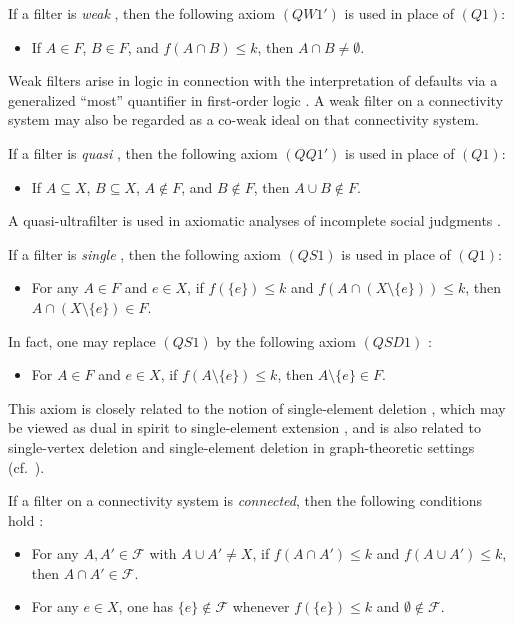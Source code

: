 \documentclass[10pt]{book}
\theoremstyle{definition}
\begin{document}
If a filter is \emph{weak} \cite{15,81,111,FujitaMaxQuasi2024}, then the following axiom \((QW1')\) is used in place of \((Q1)\):
\begin{itemize}
    \item[(QW1')] If \(A\in F\), \(B\in F\), and \(f(A\cap B)\leq k\), then \(A\cap B\neq\emptyset\).
\end{itemize}
Weak filters arise in logic in connection with the interpretation of defaults via a generalized ``most'' quantifier in first-order logic \cite{81,111,243,224}.  
A weak filter on a connectivity system may also be regarded as a co-weak ideal on that connectivity system.

If a filter is \emph{quasi} \cite{14,112,FujitaMaxQuasi2024}, then the following axiom \((QQ1')\) is used in place of \((Q1)\):
\begin{itemize}
    \item[(QQ1')] If \(A\subseteq X\), \(B\subseteq X\), \(A\notin F\), and \(B\notin F\), then \(A\cup B\notin F\).
\end{itemize}
A quasi-ultrafilter is used in axiomatic analyses of incomplete social judgments \cite{112}.

If a filter is \emph{single} \cite{4}, then the following axiom \((QS1)\) is used in place of \((Q1)\):
\begin{itemize}
    \item[(QS1)] For any \(A\in F\) and \(e\in X\), if \(f(\{e\})\leq k\) and \(f(A\cap (X\setminus\{e\}))\leq k\), then \(A\cap (X\setminus\{e\})\in F\).
\end{itemize}

In fact, one may replace \((QS1)\) by the following axiom \((QSD1)\) \cite{4}:
\begin{itemize}
    \item[(QSD1)] For \(A\in F\) and \(e\in X\), if \(f(A\setminus\{e\})\leq k\), then \(A\setminus\{e\}\in F\).
\end{itemize}
This axiom is closely related to the notion of single-element deletion \cite{134,135,136}, which may be viewed as dual in spirit to single-element extension \cite{245,246,247,248,249}, and is also related to single-vertex deletion and single-element deletion in graph-theoretic settings (cf.\ \cite{385,386,387}).

If a filter on a connectivity system is \emph{connected}, then the following conditions hold \cite{FujitaGrill2024}:
\begin{itemize}
    \item[(CF4)] For any \(A,A'\in\mathcal{F}\) with \(A\cup A'\neq X\), if \(f(A\cap A')\leq k\) and \(f(A\cup A')\leq k\), then \(A\cap A'\in\mathcal{F}\).
    \item[(CF5)] For any \(e\in X\), one has \(\{e\}\notin\mathcal{F}\) whenever \(f(\{e\})\leq k\) and \(\emptyset\notin\mathcal{F}\).
\end{itemize}
\end{document}
